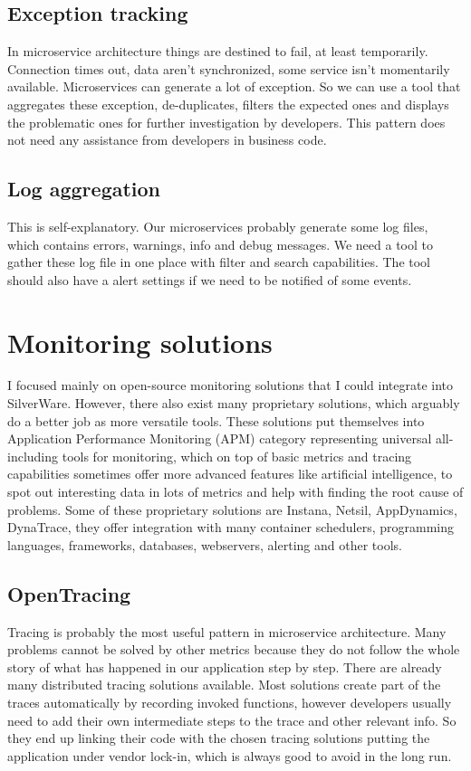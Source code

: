 \documentclass[12pt,oneside]{fithesis2}
\begin{document}
\subsection{Exception tracking}
In microservice architecture things are destined to fail, at least temporarily. Connection times out, data aren't synchronized, some service isn't momentarily available. Microservices can generate a lot of exception. So we can use a tool that aggregates these exception, de-duplicates, filters the expected ones and displays the problematic ones for further investigation by developers. This pattern does not need any assistance from developers in business code.

\subsection{Log aggregation}
This is self-explanatory. Our microservices probably generate some log files, which contains errors, warnings, info and debug messages. We need a tool to gather these log file in one place with filter and search capabilities. The tool should also have a alert settings if we need to be notified of some events.

\section{Monitoring solutions}

I focused mainly on open-source monitoring solutions that I could integrate into SilverWare. However, there also exist many proprietary solutions, which arguably do a better job as more versatile tools. These solutions put themselves into Application Performance Monitoring (APM) category representing universal all-including tools for monitoring, which on top of basic metrics and tracing capabilities sometimes offer more advanced features like artificial intelligence, to spot out interesting data in lots of metrics and help with finding the root cause of problems. Some of these proprietary solutions are Instana, Netsil, AppDynamics, DynaTrace, they offer integration with many container schedulers, programming languages, frameworks, databases, webservers, alerting and other tools.

\subsection{OpenTracing}

Tracing is probably the most useful pattern in microservice architecture. Many problems cannot be solved by other metrics because they do not follow the whole story of what has happened in our application step by step. There are already many distributed tracing solutions available. Most solutions create part of the traces automatically by recording invoked functions, however developers usually need to add their own intermediate steps to the trace and other relevant info. So they end up linking their code with the chosen tracing solutions putting the application under vendor lock-in, which is always good to avoid in the long run.
\end{document}
